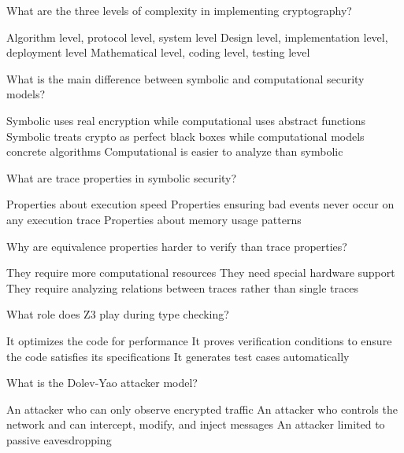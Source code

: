 \documentclass[10pt,a4paper,american]{exam}
\begin{document}
\begin{questions}
	\question What are the three levels of complexity in implementing cryptography?
	\begin{randomizechoices}
		\choice Algorithm level, protocol level, system level
		\CorrectChoice Design level, implementation level, deployment level
		\choice Mathematical level, coding level, testing level
	\end{randomizechoices}

	\question What is the main difference between symbolic and computational security models?
	\begin{randomizechoices}
		\choice Symbolic uses real encryption while computational uses abstract functions
		\CorrectChoice Symbolic treats crypto as perfect black boxes while computational models concrete algorithms
		\choice Computational is easier to analyze than symbolic
	\end{randomizechoices}

	\question What are trace properties in symbolic security?
	\begin{randomizechoices}
		\choice Properties about execution speed
		\CorrectChoice Properties ensuring bad events never occur on any execution trace
		\choice Properties about memory usage patterns
	\end{randomizechoices}

	\question Why are equivalence properties harder to verify than trace properties?
	\begin{randomizechoices}
		\choice They require more computational resources
		\choice They need special hardware support
		\CorrectChoice They require analyzing relations between traces rather than single traces
	\end{randomizechoices}

	\question What role does Z3 play during \fstar type checking?
	\begin{randomizechoices}
		\choice It optimizes the code for performance
		\CorrectChoice It proves verification conditions to ensure the code satisfies its specifications
		\choice It generates test cases automatically
	\end{randomizechoices}

	\question What is the Dolev-Yao attacker model?
	\begin{randomizechoices}
		\choice An attacker who can only observe encrypted traffic
		\CorrectChoice An attacker who controls the network and can intercept, modify, and inject messages
		\choice An attacker limited to passive eavesdropping
	\end{randomizechoices}


\end{questions}
\end{document}
